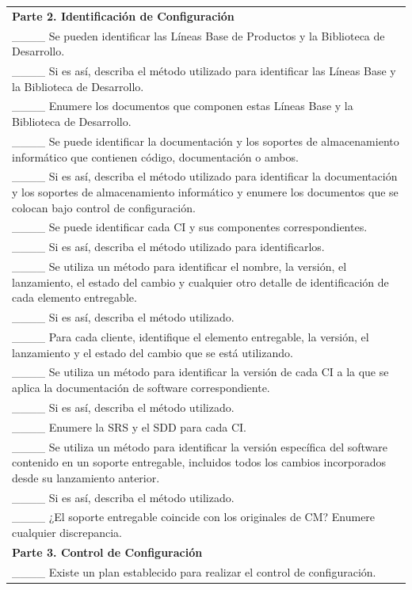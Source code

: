 \begin{table}[H]
\begin{tabular}{|p{14cm}|}
\textbf{Parte 2. Identificación de Configuración} \\
\_\_\_\_ Se pueden identificar las Líneas Base de Productos y la Biblioteca de Desarrollo. \\
\_\_\_\_ Si es así, describa el método utilizado para identificar las Líneas Base y la Biblioteca de Desarrollo. \\
\_\_\_\_ Enumere los documentos que componen estas Líneas Base y la Biblioteca de Desarrollo. \\
\_\_\_\_ Se puede identificar la documentación y los soportes de almacenamiento informático que contienen código, documentación o ambos. \\
\_\_\_\_ Si es así, describa el método utilizado para identificar la documentación y los soportes de almacenamiento informático y enumere los documentos que se colocan bajo control de configuración. \\
\_\_\_\_ Se puede identificar cada CI y sus componentes correspondientes. \\
\_\_\_\_ Si es así, describa el método utilizado para identificarlos. \\
\_\_\_\_ Se utiliza un método para identificar el nombre, la versión, el lanzamiento, el estado del cambio y cualquier otro detalle de identificación de cada elemento entregable. \\
\_\_\_\_ Si es así, describa el método utilizado. \\
\_\_\_\_ Para cada cliente, identifique el elemento entregable, la versión, el lanzamiento y el estado del cambio que se está utilizando. \\
\_\_\_\_ Se utiliza un método para identificar la versión de cada CI a la que se aplica la documentación de software correspondiente. \\
\_\_\_\_ Si es así, describa el método utilizado. \\
\_\_\_\_ Enumere la SRS y el SDD para cada CI. \\
\_\_\_\_ Se utiliza un método para identificar la versión específica del software contenido en un soporte entregable, incluidos todos los cambios incorporados desde su lanzamiento anterior. \\
\_\_\_\_ Si es así, describa el método utilizado. \\
\_\_\_\_ ¿El soporte entregable coincide con los originales de CM? Enumere cualquier discrepancia. \\
\textbf{Parte 3. Control de Configuración} \\
\_\_\_\_ Existe un plan establecido para realizar el control de configuración. \\

\end{tabular}
\end{table}
